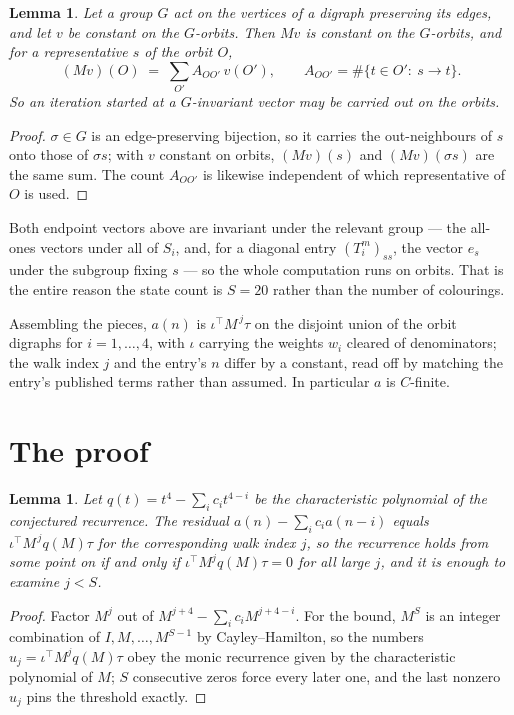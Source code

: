 \documentclass[11pt,a4paper]{article}
\theoremstyle{plain}
\newtheorem{lemma}[theorem]{Lemma}
\theoremstyle{definition}
\begin{document}
\begin{lemma}\label{lem:lump}
Let a group $G$ act on the vertices of a digraph preserving its edges, and let $v$ be constant
on the $G$-orbits. Then $Mv$ is constant on the $G$-orbits, and for a representative $s$ of
the orbit $O$,
\[
(Mv)(O)\;=\;\sum_{O'}A_{OO'}\,v(O'),\qquad
A_{OO'}=\#\{t\in O':\ s\to t\} .
\]
So an iteration started at a $G$-invariant vector may be carried out on the orbits.
\end{lemma}

\begin{proof}
$\sigma\in G$ is an edge-preserving bijection, so it carries the out-neighbours of $s$ onto
those of $\sigma s$; with $v$ constant on orbits, $(Mv)(s)$ and $(Mv)(\sigma s)$ are the same
sum. The count $A_{OO'}$ is likewise independent of which representative of $O$ is used.
\end{proof}

Both endpoint vectors above are invariant under the relevant group --- the all-ones vectors
under all of $S_i$, and, for a diagonal entry $(T_i^m)_{ss}$, the vector $e_s$ under the
subgroup fixing $s$ --- so the whole computation runs on orbits. That is the entire reason the
state count is $S=20$ rather than the number of colourings.

Assembling the pieces, $a(n)$ is $\iota^{\!\top}M^{\,j}\tau$ on the disjoint union of the
orbit digraphs for $i=1,\dots,4$, with $\iota$ carrying the weights $w_i$ cleared of
denominators; the walk index $j$ and the entry's $n$ differ by a constant, read off by
matching the entry's published terms rather than assumed. In particular $a$ is $C$-finite.

\section{The proof}

\begin{lemma}\label{lem:crit}
Let $q(t)=t^{4}-\sum_i c_it^{4-i}$ be the characteristic polynomial of the
conjectured recurrence. The residual $a(n)-\sum_ic_ia(n-i)$ equals
$\iota^{\!\top}M^{\,j}q(M)\tau$ for the corresponding walk index $j$, so the recurrence
holds from some point on if and only if $\iota^{\!\top}M^{j}q(M)\tau=0$ for all large $j$,
and it is enough to examine $j<S$.
\end{lemma}

\begin{proof}
Factor $M^{j}$ out of $M^{j+4}-\sum_ic_iM^{j+4-i}$. For the bound, $M^{S}$
is an integer combination of $I,M,\dots,M^{S-1}$ by Cayley--Hamilton, so the numbers
$u_j=\iota^{\!\top}M^{j}q(M)\tau$ obey the monic recurrence given by the characteristic
polynomial of $M$; $S$ consecutive zeros force every later one, and the last nonzero $u_j$
pins the threshold exactly.
\end{proof}
\end{document}
